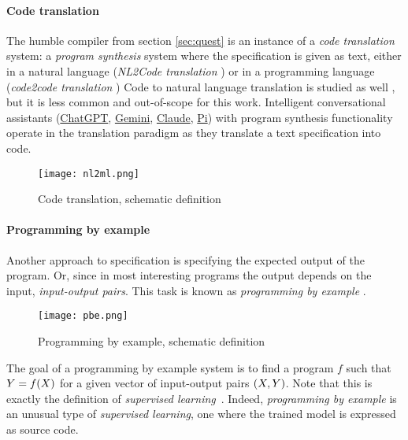 
\paragraph{Code translation}

The humble compiler from section \ref{sec:quest} is an instance of a \emph{code translation} system: a \emph{program synthesis} system where the specification is given as text, either in a natural language (\emph{NL2Code translation} \cite{wangNaturalLanguageCode2023, zanLargeLanguageModels2023}) or in a programming language (\emph{code2code translation} \cite{radfordImprovingLanguageUnderstanding})
Code to natural language translation is studied as well \cite[section 5.1]{leDeepLearningSource2020}, but it is less common and out-of-scope for this work.
Intelligent conversational assistants (\href{https://chat.openai.com/}{ChatGPT}, \href{https://gemini.google.com}{Gemini}, \href{https://claude.ai/}{Claude}, \href{https://pi.ai/}{Pi}) with program synthesis functionality operate in the translation paradigm as they translate a text specification into code.

\begin{figure}[H]
    \centering
    \texttt{[image: nl2ml.png]}
    \caption{Code translation, schematic definition}
    \label{fig:nl2ml}
\end{figure}

\paragraph{Programming by example}

Another approach to specification is specifying the expected output of the program. Or, since in most interesting programs the output depends on the input, \emph{input-output pairs}. This task is known as \emph{programming by example} \cite{halbertProgrammingExample1984, psb2}.

\begin{figure}[H]
    \centering
    \texttt{[image: pbe.png]}
    \caption{Programming by example, schematic definition}
    \label{fig:pbe}
\end{figure}

The goal of a programming by example system is to find a program $f$ such that $Y=f(X)$ for a given vector of input-output pairs $(X,Y)$. 
Note that this is exactly the definition of \emph{supervised learning}~\cite{cunninghamSupervisedLearning2008}.
Indeed, \emph{programming by example} is an unusual type of \emph{supervised learning}, one where the trained model is expressed as source code.

